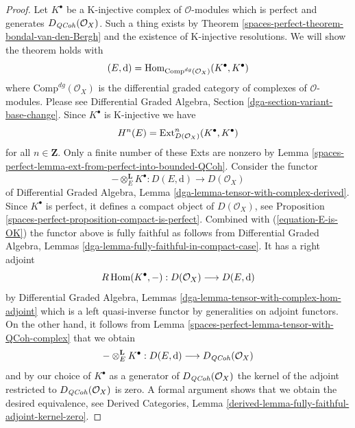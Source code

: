 \begin{proof}
Let $K^\bullet$ be a K-injective complex of $\mathcal{O}$-modules which
is perfect and generates $D_{\mathit{QCoh}}(\mathcal{O}_X)$. Such a
thing exists by Theorem \ref{spaces-perfect-theorem-bondal-van-den-Bergh}
and the existence of K-injective resolutions. We will show the
theorem holds with
$$
(E, \text{d}) = \operatorname{Hom}_{\text{Comp}^{dg}(\mathcal{O}_X)}(K^\bullet, K^\bullet)
$$
where $\text{Comp}^{dg}(\mathcal{O}_X)$ is the differential graded category
of complexes of $\mathcal{O}$-modules. Please see
Differential Graded Algebra, Section \ref{dga-section-variant-base-change}.
Since $K^\bullet$ is K-injective we
have
\begin{equation}
\label{equation-E-is-OK}
H^n(E) = \operatorname{Ext}^n_{D(\mathcal{O}_X)}(K^\bullet, K^\bullet)
\end{equation}
for all $n \in \mathbf{Z}$. Only a finite number of these Exts
are nonzero by Lemma \ref{spaces-perfect-lemma-ext-from-perfect-into-bounded-QCoh}.
Consider the functor
$$
- \otimes_E^\mathbf{L} K^\bullet :
D(E, \text{d}) \longrightarrow D(\mathcal{O}_X)
$$
of
Differential Graded Algebra, Lemma
\ref{dga-lemma-tensor-with-complex-derived}.
Since $K^\bullet$ is perfect, it defines a compact object of
$D(\mathcal{O}_X)$, see Proposition \ref{spaces-perfect-proposition-compact-is-perfect}.
Combined with (\ref{equation-E-is-OK}) the functor above is fully
faithful as follows from
Differential Graded Algebra, Lemmas
\ref{dga-lemma-fully-faithful-in-compact-case}. It has a right adjoint
$$
R\operatorname{Hom}(K^\bullet, - ) : D(\mathcal{O}_X) \longrightarrow D(E, \text{d})
$$
by Differential Graded Algebra, Lemmas
\ref{dga-lemma-tensor-with-complex-hom-adjoint}
which is a left quasi-inverse functor by generalities on adjoint
functors. On the other hand, it follows from
Lemma \ref{spaces-perfect-lemma-tensor-with-QCoh-complex} that we obtain
$$
- \otimes_E^\mathbf{L} K^\bullet :
D(E, \text{d}) \longrightarrow D_{\mathit{QCoh}}(\mathcal{O}_X)
$$
and by our choice of $K^\bullet$ as a generator of
$D_{\mathit{QCoh}}(\mathcal{O}_X)$ the kernel of the adjoint
restricted to $D_{\mathit{QCoh}}(\mathcal{O}_X)$ is zero.
A formal argument shows that we obtain the desired equivalence, see
Derived Categories, Lemma
\ref{derived-lemma-fully-faithful-adjoint-kernel-zero}.
\end{proof}

